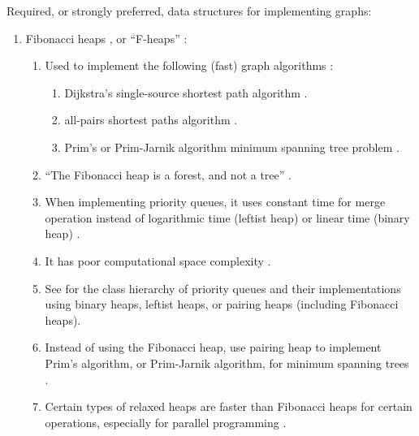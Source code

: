 Required, or strongly preferred, data structures for implementing graphs: \vspace{-0.3cm}
\begin{enumerate} \itemsep -4pt
\item Fibonacci heaps \cite[\S19, pp. 505--530]{Cormen2009}, or ``F-heaps'' \cite[\S6, pp. 101]{Cormen2013}: \vspace{-0.3cm}
	\begin{enumerate} \itemsep -2pt
	\item Used to implement the following (fast) graph algorithms \cite[\S V, pp. 481--482; \S19, pp.505]{Cormen2009}: \vspace{-0.2cm}
		\begin{enumerate} \itemsep - 2pt
		\item Dijkstra's single-source shortest path algorithm \cite[\S24.8, pp. 351; \S57, pp. 925]{Goldman2008} \cite[\S14.6.2, pp. 667; \S14.Chapter Notes, pp. 696]{Goodrich2013} \cite[\S13.Chapter Notes, pp. 663]{Goodrich2011}.
		\item all-pairs shortest paths algorithm \cite[\S24.8, pp. 351]{Goldman2008}.
		\item Prim's or Prim-Jarnik algorithm minimum spanning tree problem \cite[\S24.8, pp. 351; \S57, pp. 925]{Goldman2008} \cite[\S23, pp. 624; \S23-2, pp. 638]{Cormen2009} \cite[\S14.Chapter Notes, pp. 696]{Goodrich2013} \cite[\S13.Chapter Notes, pp. 663]{Goodrich2011}.
		\end{enumerate}
	\item ``The Fibonacci heap is a forest, and not a tree'' \cite[\S28.2, pp. 426]{Goldman2008}.
	\item When implementing priority queues, it uses constant time for merge operation instead of logarithmic time (leftist heap) or linear time (binary heap) \cite[\S24.4, pp. 346]{Goldman2008}.
	\item It has poor computational space complexity \cite[\S24.4, pp. 346--347]{Goldman2008}.
	\item See \cite[\S24.7, pp. 350]{Goldman2008} for the class hierarchy of priority queues and their implementations using binary heaps, leftist heaps, or pairing heaps (including Fibonacci heaps).
	\item Instead of using the Fibonacci heap, use pairing heap to implement Prim's algorithm, or Prim-Jarnik algorithm, for minimum spanning trees \cite[\S24.8, pp. 351]{Goldman2008}. 
	\item Certain types of relaxed heaps are faster than Fibonacci heaps for certain operations, especially for parallel programming \cite[\S19.Chapter notes, pp. 530]{Cormen2009}. %

\end{enumerate}
\end{enumerate}
